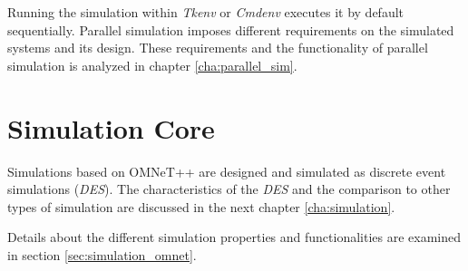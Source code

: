 Running the simulation within \emph{Tkenv} or \emph{Cmdenv} executes it by default sequentially.
Parallel simulation imposes different requirements on the simulated systems and its design.
These requirements and the functionality of parallel simulation is analyzed in chapter \ref{cha:parallel_sim}.

\section{Simulation Core}
Simulations based on OMNeT++ are designed and simulated as discrete event simulations (\emph{DES}).
The characteristics of the \emph{DES} and the comparison to other types of simulation are discussed in the next chapter \ref{cha:simulation}.

Details about the different simulation properties and functionalities are examined in section \ref{sec:simulation_omnet}.